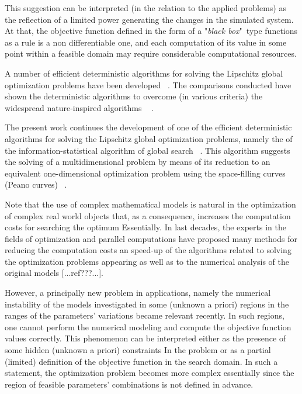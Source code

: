 \documentclass[runningheads]{llncs}
\begin{document}
This suggestion can be interpreted (in the relation to the applied problems) as the reflection of a limited power generating the changes in the simulated system. At that, the objective function defined in the form of a "\textit{black box}"\ type functions as a rule is a non differentiable one, and each computation of its value in some point within a feasible domain may require considerable computational resources.

A number of efficient deterministic algorithms for solving the Lipschitz global optimization problems have been developed ~\cite{Jones2009,Birect2020,Sergeyev2017}. The comparisons conducted have shown the deterministic algorithms to overcome (in various criteria) the widespread nature-inspired algorithms ~\cite{Liberti2005,Sergeyev2018,Sovrasov2019} .

The present work continues the development of one of the efficient deterministic algorithms for solving the Lipschitz global optimization problems, namely the of the information-statistical algorithm of global search ~\cite{indexMethod,strongin1978,Strongin2000}. This algorithm suggests the solving of a multidimensional problem by means of its reduction to an equivalent one-dimensional optimization problem using the space-filling curves (Peano curves) ~\cite{Sergeyev2013}. 

Note that the use of complex mathematical models is natural in the optimization of complex real world objects that, as a consequence, increases the computation costs for searching the optimum Essentially. In last decades, the experts in the fields of optimization and parallel computations have proposed many methods for reducing the computation costs an speed-up of the algorithms related to solving the optimization problems appearing as well as to the numerical analysis of the original models [...ref???...].

However, a principally new problem in applications, namely the numerical instability of the models investigated in some (unknown a priori) regions in the ranges of the parameters’ variations became relevant recently. In such regions, one cannot perform the numerical modeling and compute the objective function values correctly. This phenomenon can be interpreted either as the presence of some hidden (unknown a priori) constraints In the problem or as a partial (limited) definition of the objective function in the search domain. In such a statement, the optimization problem becomes more complex essentially since the region of feasible parameters’ combinations is not defined in advance.
\end{document}
